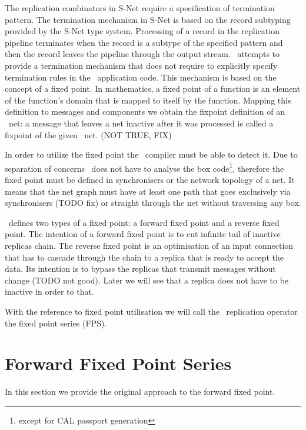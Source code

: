 The replication combinators in S-Net require a specification of termination pattern. The termination mechanism in S-Net is based on the record subtyping provided by the S-Net type system. Processing of a record in the replication pipeline terminates when the record is a subtype of the specified pattern and then the record leaves the pipeline through the output stream. \ak\ attempts to provide a termination mechanism that does not require to explicitly specify termination rules in the \ak\ application code. This mechanism is based on the concept of a fixed point. In mathematics, a fixed point of a function is an element of the function's domain that is mapped to itself by the function. Mapping this definition to messages and components we obtain the fixpoint definition of an \ak\ net: a message that leaves a net inactive after it was processed is called a fixpoint of the given \ak\ net. (NOT TRUE, FIX)

In order to utilize the fixed point the \ak\ compiler must be able to detect it. Due to separation of concerns \ak\ does not have to analyse the box code\footnote{except for CAL passport generation}, therefore the fixed point must be defined in synchronisers or the network topology of a net. It means that the net graph must have at least one path that goes exclusively via synchronisers (TODO fix) or straight through the net without traversing any box.

\ak\ defines two types of a fixed point: a forward fixed point and a reverse fixed point. The intention of a forward fixed point is to cut infinite tail of inactive replicas chain. The reverse fixed point is an optimisation of an input connection that has to cascade through the chain to a replica that is ready to accept the data. Its intention is to bypass the replicas that transmit messages without change (TODO not good). Later we will see that a replica does not have to be inactive in order to that.

With the reference to fixed point utilisation we will call the \ak\ replication operator the fixed point series (FPS).



    \section{Forward Fixed Point Series\label{ffp}}
In this section we provide the original approach to the forward fixed point.


